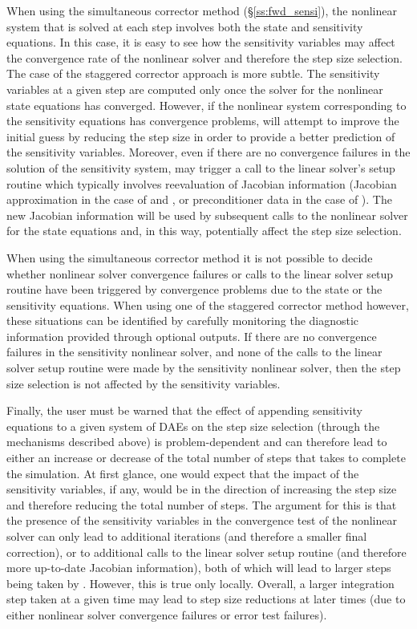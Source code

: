 When using the simultaneous corrector method (\S\ref{ss:fwd_sensi}),
the nonlinear system that is solved at each step involves both the state
and sensitivity equations. In this case, it is easy to see how the sensitivity 
variables may affect the convergence rate of the nonlinear solver and therefore
the step size selection. 
The case of the staggered corrector approach is more subtle. The sensitivity 
variables at a given step are 
computed only once the solver for the nonlinear state equations has converged.
However, if the nonlinear system corresponding to the sensitivity equations
has convergence problems, {\idas} will attempt to improve the initial guess
by reducing the step size in order to provide a better prediction of the
sensitivity variables. Moreover, even if there are no convergence failures in
the solution of the sensitivity system, {\idas} may trigger a call to the
linear solver's setup routine which typically involves reevaluation of Jacobian
information (Jacobian approximation in the case of {\idadense} and {\idaband}, or
preconditioner data in the case of {\idaspgmr}). The new Jacobian information
will be used by subsequent calls to the nonlinear solver for the state equations
and, in this way, potentially affect the step size selection.

When using the simultaneous corrector method it is not possible to decide whether 
nonlinear solver convergence failures or calls to the linear solver setup routine
have been triggered by convergence problems due to the state or the sensitivity 
equations.
When using one of the staggered corrector method however, these situations can be 
identified by carefully monitoring the diagnostic information provided through 
optional outputs. If there are no convergence
failures in the sensitivity nonlinear solver, and none
of the calls to the linear solver setup routine were made by the sensitivity
nonlinear solver, then the step size selection is
not affected by the sensitivity variables.

Finally, the user must be warned that the effect of appending sensitivity 
equations to a given system of DAEs on the step size selection 
(through the mechanisms described above) is problem-dependent and can therefore
lead to either an increase or decrease of the total number of steps that {\idas} takes
to complete the simulation. At first glance, one would expect that the impact
of the sensitivity variables, if any, would be in the direction of increasing the
step size and therefore reducing the total number of steps. The argument for this
is that the presence of the sensitivity variables in the convergence test of the
nonlinear solver can only lead to additional iterations (and therefore a smaller
final correction), or to additional calls to the linear solver setup routine
(and therefore more up-to-date Jacobian information), both of which will lead
to larger steps being taken by {\idas}. However, this is true only locally.
Overall, a larger integration step taken at a given time may lead to 
step size reductions at later times (due to either nonlinear solver convergence
failures or error test failures).